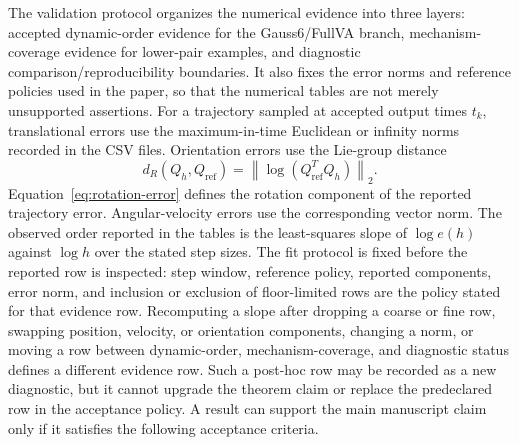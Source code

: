 \documentclass[preprint,12pt]{elsarticle}
\newcommand{\method}{Gauss6\slash FullVA}
\begin{document}
The validation protocol organizes the numerical evidence into three layers:
accepted dynamic-order evidence for the \method{} branch, mechanism-coverage
evidence for lower-pair examples, and diagnostic comparison/reproducibility
boundaries. It also fixes the error norms and reference policies used in the
paper, so that the numerical tables are not merely unsupported assertions.
For a trajectory sampled at accepted output times
$t_k$, translational errors use the maximum-in-time Euclidean or infinity
norms recorded in the CSV files. Orientation errors use the Lie-group
distance
\begin{equation}
  d_R(Q_h,Q_{\mathrm{ref}})=
  \left\|\log(Q_{\mathrm{ref}}^TQ_h)\right\|_2 .
  \label{eq:rotation-error}
\end{equation}
Equation~\eqref{eq:rotation-error} defines the rotation component of the
reported trajectory error.
Angular-velocity errors use the corresponding vector norm. The observed order
reported in the tables is the least-squares slope of
$\log e(h)$ against $\log h$ over the stated step sizes. The fit protocol is
fixed before the reported row is inspected: step window, reference policy,
reported components, error norm, and inclusion or exclusion of floor-limited
rows are the policy stated for that evidence row. Recomputing a slope after
dropping a coarse or fine row, swapping position, velocity, or orientation
components, changing a norm, or moving a row between dynamic-order,
mechanism-coverage, and diagnostic status defines a different evidence row.
Such a post-hoc row may be recorded as a new diagnostic, but it cannot upgrade
the theorem claim or replace the predeclared row in the acceptance policy. A
result can support the main manuscript claim only if it satisfies the following
acceptance criteria.
\end{document}
